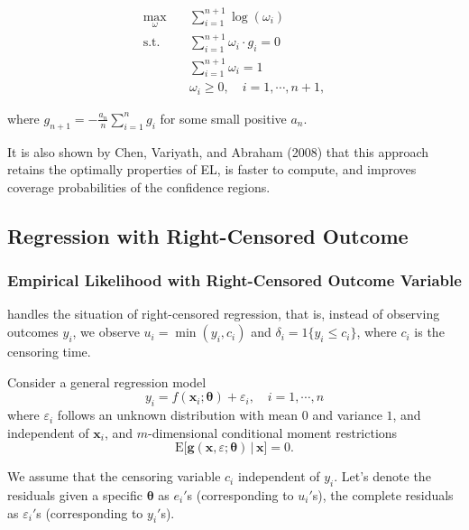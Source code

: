 \documentclass[article]{jss}
\renewcommand{\|}{\,|\,}
\begin{document}
\begin{equation} \label{eq:noncensoptadj}
\begin{split}
  \max_{\omega}\quad & \sum_{i=1}^{n+1} \log(\omega_i) \\
  \text{s.t.}\quad & \sum_{i=1}^{n+1} \omega_i\cdot g_i = 0 \\
  & \sum_{i=1}^{n+1} \omega_i = 1 \\
  & \omega_i \geq 0, \quad i=1,\cdots,{n+1},
\end{split}
\end{equation}

where \(g_{n+1} = -\frac{a_n}{n} \sum_{i=1}^n g_i\) for some small positive \(a_n\).

It is also shown by Chen, Variyath, and Abraham (2008) that this approach retains the optimally properties of EL, is faster to compute, and improves coverage probabilities of the confidence regions.

\hypertarget{regression-with-right-censored-outcome}{%
\subsection{Regression with Right-Censored Outcome}\label{regression-with-right-censored-outcome}}

\hypertarget{empirical-likelihood-with-right-censored-outcome-variable}{%
\subsubsection{Empirical Likelihood with Right-Censored Outcome Variable}\label{empirical-likelihood-with-right-censored-outcome-variable}}

 handles the situation of right-censored regression, that is, instead of observing outcomes \(y_i\), we observe \(u_i = \min(y_i, c_i)\) and \(\delta_i = \mathfrak 1\{y_i \le c_i\}\), where \(c_i\) is the censoring time.

Consider a general regression model
\[
  y_i = f(\bm x_i; \bm \theta) + \varepsilon_i, \quad i=1,\cdots,n
\]
where \(\varepsilon_i\) follows an unknown distribution with mean \(0\) and variance \(1\), and independent of \(\bm x_i\), and \(m\)-dimensional conditional moment restrictions
\begin{equation}\label{eq:cmom}
  \textrm{E}\bigl[\bm g(\bm x, \varepsilon; \bm \theta) \,|\, \bm x\bigr] = 0.
\end{equation}

We assume that the censoring variable \(c_i\) independent of \(y_i\). Let's denote the residuals given a specific \(\bm \theta\) as \(e_i'\)s (corresponding to \(u_i'\)s), the complete residuals as \(\varepsilon_i'\)s (corresponding to \(y_i'\)s).
\end{document}
